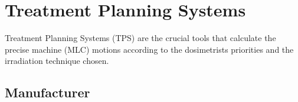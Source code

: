 


\section{Treatment Planning Systems}
Treatment Planning Systems (TPS) are the crucial tools that calculate the precise machine (MLC) motions according to the dosimetrists priorities and the irradiation technique chosen.

\subsection{Manufacturer}
%	
%	
\Needspace{7cm}
